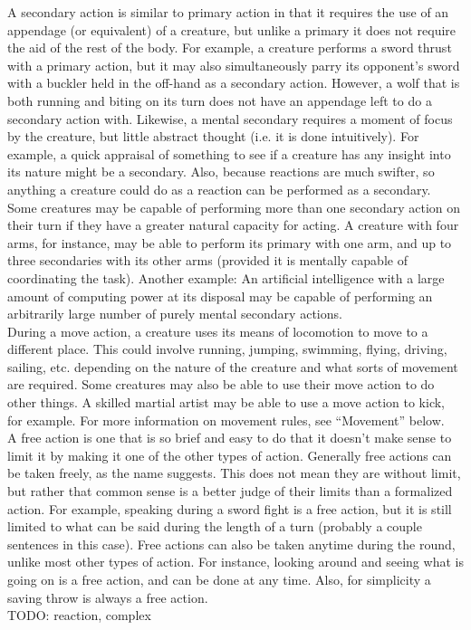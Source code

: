 \documentclass[letterpaper,titlepage,openany,twocolumn]{book}
\begin{document}
A secondary action is similar to primary action in that it requires the use of an appendage (or equivalent) of a creature, but unlike a primary it does not require the aid of the rest of the body. For example, a creature performs a sword thrust with a primary action, but it may also simultaneously parry its opponent’s sword with a buckler held in the off-hand as a secondary action. However, a wolf that is both running and biting on its turn does not have an appendage left to do a secondary action with. Likewise, a mental secondary requires a moment of focus by the creature, but little abstract thought (i.e. it is done intuitively). For example, a quick appraisal of something to see if a creature has any insight into its nature might be a secondary. Also, because reactions are much swifter, so anything a creature could do as a reaction can be performed as a secondary. Some creatures may be capable of performing more than one secondary action on their turn if they have a greater natural capacity for acting. A creature with four arms, for instance, may be able to perform its primary with one arm, and up to three secondaries with its other arms (provided it is mentally capable of coordinating the task). Another example: An artificial intelligence with a large amount of computing power at its disposal may be capable of performing an arbitrarily large number of purely mental secondary actions.\\

During a move action, a creature uses its means of locomotion to move to a different place. This could involve running, jumping, swimming, flying, driving, sailing, etc. depending on the nature of the creature and what sorts of movement are required. Some creatures may also be able to use their move action to do other things. A skilled martial artist may be able to use a move action to kick, for example. For more information on movement rules, see “Movement” below.\\

A free action is one that is so brief and easy to do that it doesn’t make sense to limit it by making it one of the other types of action. Generally free actions can be taken freely, as the name suggests. This does not mean they are without limit, but rather that common sense is a better judge of their limits than a formalized action. For example, speaking during a sword fight is a free action, but it is still limited to what can be said during the length of a turn (probably a couple sentences in this case). Free actions can also be taken anytime during the round, unlike most other types of action. For instance, looking around and seeing what is going on is a free action, and can be done at any time. Also, for simplicity a saving throw is always a free action.\\
TODO: reaction, complex\\
\end{document}
